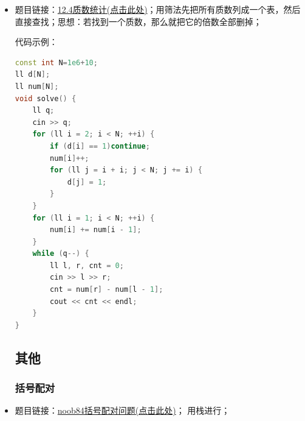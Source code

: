 \begin{itemize}
代码示例：
\begin{lstlisting}[language=C++]
auto solve() -> void {
	ll n, m;
	cin >> n >> m;
	string s1, s2;
	cin >> s1 >> s2;
	queue<ll> q1, q2;
	for (ll i = 0; i < n; i++) {
		q1.emplace(s1[i] - '0');
	}
	for (ll i = 0; i < m; i++) {
		q2.emplace(s2[i] - '0');
	}
	while (q1.size() && q2.size()) {
		if (q1.front() == q2.front()) {
			q1.pop();
			q2.pop();
		} else {
			const ll x = q1.front();
			q1.pop();
			q1.front() ^= x;
		}
	}
	//0和任意数异或都等于那个数，所以最后如果剩下偶数个1或者若干个0时可以消掉；
	ll remain = 0;
	while (q1.size()) {
		remain ^= q1.front();
		q1.pop();
	}
	if (remain == 0 && q2.size() == 0) {
		cout << "YES" << endl;
	} else {
		cout << "NO" << endl;
	}
}
\end{lstlisting}
\subsection{每日一题}
\subsubsection{12.4质数统计(筛法列质数表)}
\item 题目链接：\href{https://www.nowcoder.com/practice/d832b0c1a0bd4394a3229f06c6f0b50b?channelPut=tracker2}{12.4质数统计(点击此处)}；用筛法先把所有质数列成一个表，然后直接查找；思想：若找到一个质数，那么就把它的倍数全部删掉；

代码示例：\\
\begin{lstlisting}[language=C++]
const int N=1e6+10;
ll d[N];
ll num[N];
void solve() {
	ll q;
	cin >> q;
	for (ll i = 2; i < N; ++i) {
		if (d[i] == 1)continue;
		num[i]++;
		for (ll j = i + i; j < N; j += i) {
			d[j] = 1;
		}
	}
	for (ll i = 1; i < N; ++i) {
		num[i] += num[i - 1];
	}
	while (q--) {
		ll l, r, cnt = 0;
		cin >> l >> r;
		cnt = num[r] - num[l - 1];
		cout << cnt << endl;
	}
}
\end{lstlisting}
\subsection{其他}
\subsubsection{括号配对}
\item 题目链接：\href{https://www.nowcoder.com/practice/57260c08eaa44feababd05b328b897d7?tpId=383&tqId=296645&sourceUrl=%2Fexam%2Foj%2Fta%3FtpId%3D383%26channelPut%3Dacbanner25}{noob84括号配对问题(点击此处)}；
用栈进行；


\end{itemize}
